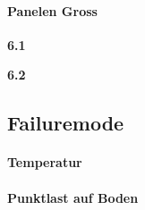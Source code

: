 \paragraph{Panelen Gross}
\begin{description}
  \item \textbf{6.1 }
  \item \textbf{6.2 }
\end{description}


\subsection{Failuremode}
\paragraph{Temperatur}
\paragraph{Punktlast auf Boden}




\newpage
